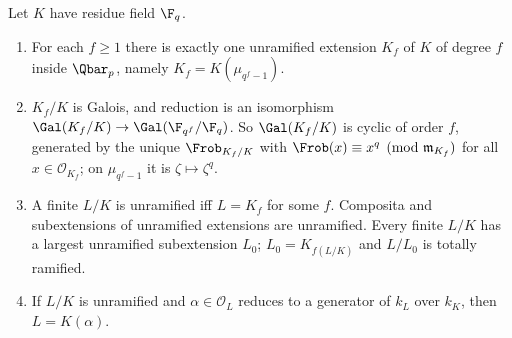 \begin{theorem}\label{thm:local:unramified}
Let $K$ have residue field $\F_q$.
\begin{enumerate}[label=(\roman*)]
\item For each $f\ge1$ there is exactly one unramified extension $K_f$ of $K$ of degree $f$ inside $\Qbar_p$, namely $K_f=K(\mu_{q^f-1})$.
\item $K_f/K$ is Galois, and reduction is an isomorphism $\Gal(K_f/K)\to\Gal(\F_{q^f}/\F_q)$. So $\Gal(K_f/K)$ is cyclic of order $f$, generated by
the unique $\Frob_{K_f/K}$ with $\Frob(x)\equiv x^q\pmod{\mathfrak m_{K_f}}$ for all $x\in\mathcal O_{K_f}$; on $\mu_{q^f-1}$ it is $\zeta\mapsto\zeta^q$.
\item A finite $L/K$ is unramified iff $L=K_f$ for some $f$. Composita and subextensions of unramified extensions are unramified. Every
finite $L/K$ has a largest unramified subextension $L_0$; $L_0=K_{f(L/K)}$ and $L/L_0$ is totally ramified.
\item If $L/K$ is unramified and $\alpha\in\mathcal O_L$ reduces to a generator of $k_L$ over $k_K$, then $L=K(\alpha)$.
\end{enumerate}
\end{theorem}

